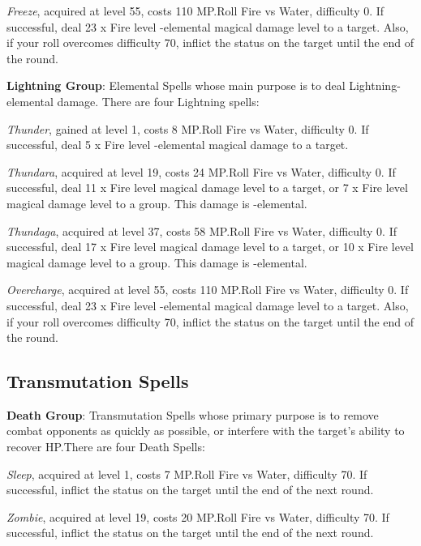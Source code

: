 \begin{multicols}{2}
    \textit{Freeze}, acquired at level 55, costs 110 MP.\@{}Roll Fire vs Water, difficulty 0. If successful, deal 23 x Fire level -elemental magical damage level to a target. Also, if your roll overcomes difficulty 70, inflict the  status on the target until the end of the round.
    
    \textbf{Lightning Group}: Elemental Spells whose main purpose is to deal Lightning-elemental damage. There are four Lightning spells:
    
    \textit{Thunder}, gained at level 1, costs 8 MP.\@{}Roll Fire vs Water, difficulty 0. If successful, deal 5 x Fire level -elemental magical damage to a target.
    
    \textit{Thundara}, acquired at level 19, costs 24 MP.\@{}Roll Fire vs Water, difficulty 0. If successful, deal 11 x Fire level magical damage level to a target, or 7 x Fire level magical damage level to a group. This damage is -elemental.
    
    \textit{Thundaga}, acquired at level 37, costs 58 MP.\@{}Roll Fire vs Water, difficulty 0. If successful, deal 17 x Fire level magical damage level to a target, or 10 x Fire level magical damage level to a group. This damage is -elemental.
    
    \textit{Overcharge}, acquired at level 55, costs 110 MP.\@{}Roll Fire vs Water, difficulty 0. If successful, deal 23 x Fire level -elemental magical damage level to a target. Also, if your roll overcomes difficulty 70, inflict the  status on the target until the end of the round.
    
    \subsection{Transmutation Spells}\label{subsec:black-transmutation}

    \textbf{Death Group}: Transmutation Spells whose primary purpose is to remove combat opponents as quickly as possible, or interfere with the target's ability to recover HP.\@{}There are four Death Spells:
    
    \textit{Sleep}, acquired at level 1, costs 7 MP.\@{}Roll Fire vs Water, difficulty 70. If successful, inflict the  status on the target until the end of the next round.
    
    \textit{Zombie}, acquired at level 19, costs 20 MP.\@{}Roll Fire vs Water, difficulty 70. If successful, inflict the  status on the target until the end of the next round.
    

\end{multicols}
